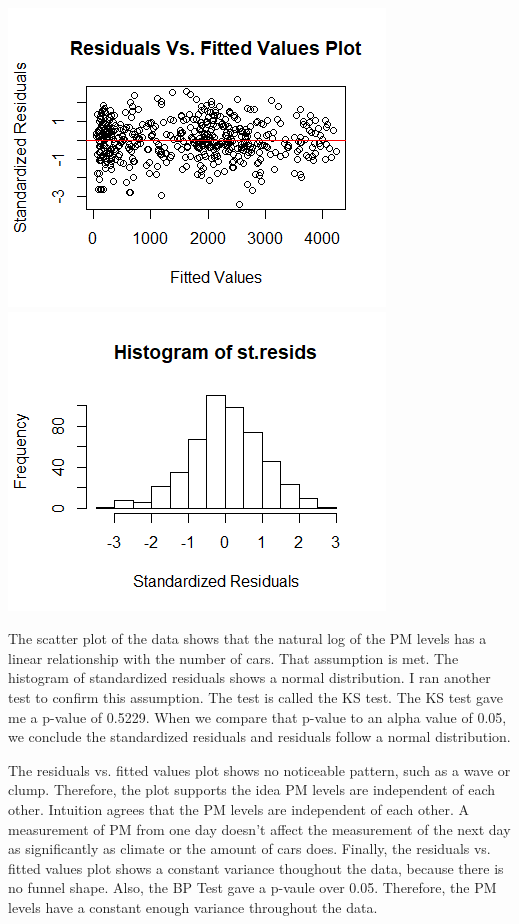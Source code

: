 \documentclass[12pt]{article}\usepackage[]{graphicx}\usepackage[]{color}
\begin{document}
\includegraphics[scale=0.8]{residsvsfitted.png}
\includegraphics[scale=0.8]{histogramstresids.png}

The scatter plot of the data shows that the natural log of the PM levels has a linear relationship with the number of cars. That assumption is met. The histogram of standardized residuals shows a normal distribution. I ran another test to confirm this assumption. The test is called the KS test. The KS test gave me a p-value of 0.5229. When we compare that p-value to an alpha value of 0.05, we conclude the standardized residuals and residuals follow a normal distribution. 

The residuals vs. fitted values plot shows no noticeable pattern, such as a wave or clump. Therefore, the plot supports the idea PM levels are independent of each other. Intuition agrees that the PM levels are independent of each other. A measurement of PM from one day doesn't affect the measurement of the next day as significantly as climate or the amount of cars does. Finally, the residuals vs. fitted values plot shows a constant variance thoughout the data, because there is no  funnel shape. Also, the BP Test gave a p-vaule over 0.05. Therefore, the PM levels have a constant enough variance throughout the data.
\end{document}
